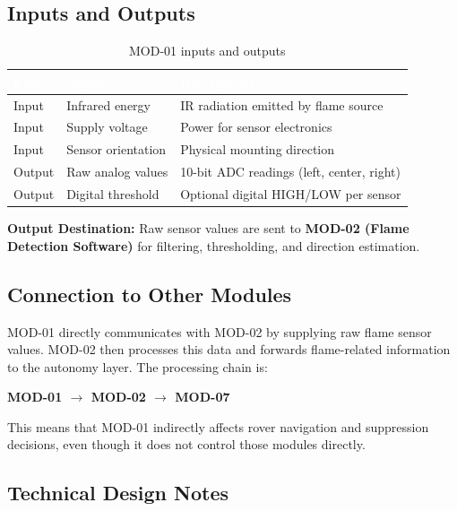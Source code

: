 \documentclass[12pt,a4paper]{article}
\newcommand{\theadtext}[1]{\textcolor{white}{\textbf{#1}}}
\begin{document}
\subsection{Inputs and Outputs}

\begin{table}[H]
\centering\small
\begin{tabularx}{\textwidth}{L{3cm} L{3cm} X}
\toprule
{}
\theadtext{Flow} & \theadtext{Signal} & \theadtext{Description} \\
\midrule
{}   Input  & Infrared energy   & IR radiation emitted by flame source \\
 Input  & Supply voltage    & Power for sensor electronics \\
   Input  & Sensor orientation & Physical mounting direction \\
 Output & Raw analog values & 10-bit ADC readings (left, center, right) \\
   Output & Digital threshold & Optional digital HIGH/LOW per sensor \\
\bottomrule
\end{tabularx}
\caption{MOD-01 inputs and outputs}
\end{table}

\textbf{Output Destination:} Raw sensor values are sent to \textbf{MOD-02 (Flame Detection Software)} for filtering, thresholding, and direction estimation.

\subsection{Connection to Other Modules}

MOD-01 directly communicates with MOD-02 by supplying raw flame sensor values.
MOD-02 then processes this data and forwards flame-related information to the
autonomy layer. The processing chain is:

\begin{center}
\textbf{MOD-01 $\rightarrow$ MOD-02 $\rightarrow$ MOD-07}
\end{center}

This means that MOD-01 indirectly affects rover navigation and suppression
decisions, even though it does not control those modules directly.

\subsection{Technical Design Notes}
\end{document}
